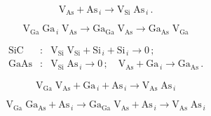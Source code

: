 \documentclass[final,3p,times,twocolumn,authoryear]{elsarticle}
\begin{document}
\begin{displaymath}
\mathrm{V}_\mathrm{As}+ \mathrm{As}_{\,i} \rightarrow \mathrm{V}_\mathrm{Si}\;\mathrm{As}_{\,i}\,.
\end{displaymath}

\cite{ZOHM2000}

\cite{FANG1990}

\begin{displaymath}
  \mathrm{V}_\mathrm{Ga}\;\mathrm{Ga}_{\,i}\;\mathrm{V}_\mathrm{As}\rightarrow \mathrm{Ga}_\mathrm{Ga}\;\mathrm{V}_\mathrm{As}
  \rightarrow \mathrm{Ga}_\mathrm{As}\;\mathrm{V}_\mathrm{Ga}
\end{displaymath}


\begin{eqnarray}
  \nonumber
  \mathrm{SiC}&:&\mathrm{V}_\mathrm{Si}\;\mathrm{V}_\mathrm{Si}+\mathrm{Si}_{\,i}+ \mathrm{Si}_{\,i} \rightarrow 0\,;\\
  \nonumber
  \mathrm{GaAs}&:&\mathrm{V}_\mathrm{Si}\;\mathrm{As}_{\,i} \rightarrow 0\,;\quad
  \mathrm{V}_\mathrm{As}+\mathrm{Ga}_{\,i} \rightarrow \mathrm{Ga}_\mathrm{As}\,.
\end{eqnarray}

\cite{OstrovskiiSST,OlikhSSC,OstrovPAN}

\cite{BoltovetsEn,Konakova2012FTPEn}

\cite{Yousefi1995,Mircea1975,Bourgoin:GaAs,ASHBY:GaAs,Fang:EL6,Lefevre1977,KolFTP1989En}

\begin{displaymath}
  \mathrm{V}_\mathrm{Ga}\;\mathrm{V}_\mathrm{As}+\mathrm{Ga}_{\,i}+\mathrm{As}_{\,i} \rightarrow \mathrm{V}_\mathrm{As}\;\mathrm{As}_{\,i}
\end{displaymath}



\begin{displaymath}
  \mathrm{V}_\mathrm{Ga}\;\mathrm{Ga}_\mathrm{As}+\mathrm{As}_{\,i} \rightarrow
  \mathrm{Ga}_\mathrm{Ga}\;\mathrm{V}_\mathrm{As}+\mathrm{As}_{\,i} \rightarrow
  \mathrm{V}_\mathrm{As}\;\mathrm{As}_{\,i}
\end{displaymath}


\end{document}
